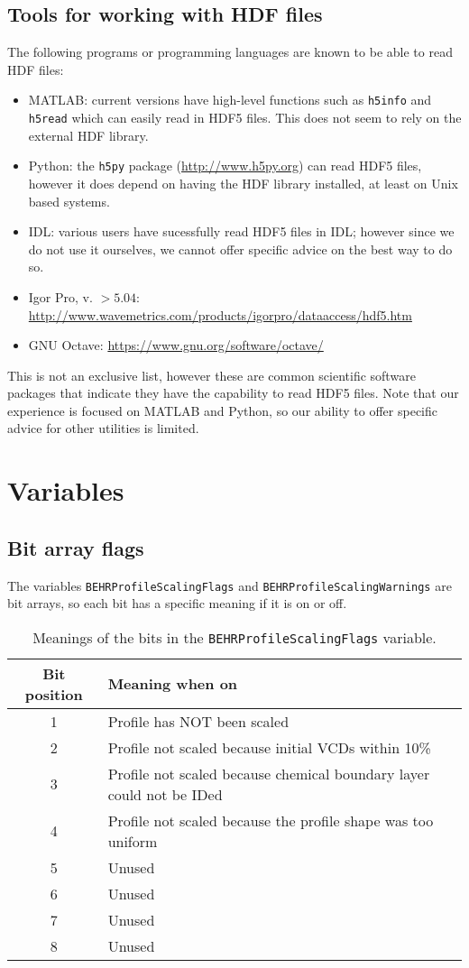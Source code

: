 \documentclass[12pt]{article}
\begin{document}
	\subsection{Tools for working with HDF files}
	The following programs or programming languages are known to be able to read HDF files:
	\begin{itemize}
		\item MATLAB: current versions have high-level functions such as \texttt{h5info} and \texttt{h5read} which can easily read in HDF5 files. This does not seem to rely on the external HDF library.
		\item Python: the \texttt{h5py} package (\url{http://www.h5py.org}) can read HDF5 files, however it does depend on having the HDF library installed, at least on Unix based systems. 
		\item IDL: various users have sucessfully read HDF5 files in IDL; however since we do not use it ourselves, we cannot offer specific advice on the best way to do so. 
		\item Igor Pro, v. $>5.04$: \url{http://www.wavemetrics.com/products/igorpro/dataaccess/hdf5.htm}
		\item GNU Octave: \url{https://www.gnu.org/software/octave/}
	\end{itemize}
	
	This is not an exclusive list, however these are common scientific software packages that indicate they have the capability to read HDF5 files. Note that our experience is focused on MATLAB and Python, so our ability to offer specific advice for other utilities is limited.
	
\section{Variables}

\subsection{Bit array flags}
	The variables \texttt{BEHRProfileScalingFlags} and \texttt{BEHRProfileScalingWarnings} are bit arrays, so each bit has a specific meaning if it is on or off.
	
	\begin{table}
	\begin{tabular}{cl}
	Bit position & Meaning when on \\ \hline
	1		&	Profile has NOT been scaled \\
	2		&	Profile not scaled because initial VCDs within 10\% \\
	3		&	Profile not scaled because chemical boundary layer could not be IDed \\
	4		&	Profile not scaled because the profile shape was too uniform \\
	5		& 	Unused \\
	6		&	Unused \\
	7		&	Unused \\
	8		&	Unused
	\end{tabular}
	\caption{Meanings of the bits in the \texttt{BEHRProfileScalingFlags} variable.}
	\end{table}
	
\end{document}
